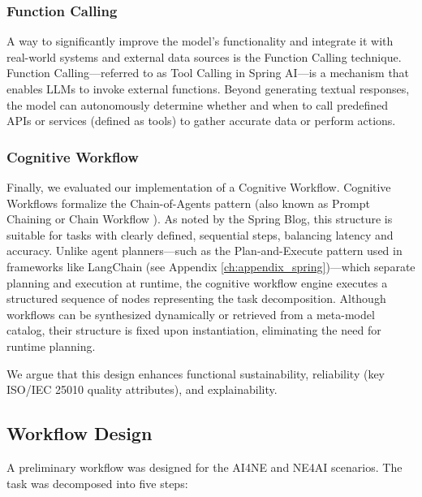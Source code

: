 \subsubsection{Function Calling }
A way to significantly improve the model's functionality and integrate it with real-world systems and external data sources is the Function Calling technique. Function Calling—referred to as Tool Calling in Spring AI—is a mechanism that enables LLMs to invoke external functions. Beyond generating textual responses, the model can autonomously determine whether and when to call predefined APIs or services (defined as tools) to gather accurate data or perform actions.

\subsubsection{Cognitive Workflow }
Finally, we evaluated our implementation of a Cognitive Workflow. Cognitive Workflows formalize the Chain-of-Agents pattern (also known as Prompt Chaining \cite{schluntz2024building} or Chain Workflow \cite{tzolov2025agentic}). As noted by the Spring Blog, this structure is suitable for tasks with clearly defined, sequential steps, balancing latency and accuracy. Unlike agent planners—such as the Plan-and-Execute pattern used in frameworks like LangChain (see Appendix \ref{ch:appendix_spring})—which separate planning and execution at runtime, the cognitive workflow engine executes a structured sequence of nodes representing the task decomposition. Although workflows can be synthesized dynamically or retrieved from a meta-model catalog, their structure is fixed upon instantiation, eliminating the need for runtime planning.

We argue that this design enhances functional sustainability, reliability (key ISO/IEC 25010 quality attributes), and explainability.



\subsection{Workflow Design}
A preliminary workflow was designed for the AI4NE and NE4AI scenarios. The task was decomposed into five steps:




